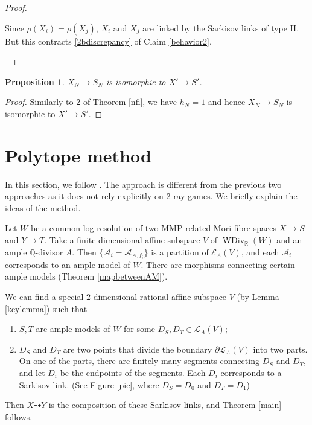\documentclass[11pt]{amsart}
\newtheorem{prop}[defn]{Proposition}
\begin{document}
\begin{proof}
\begin{enumerate}
          Since $\rho(X_{i})= \rho(X_{j})$, $X_{i}$  and $X_{j}$ are linked by  the Sarkisov links of type II. But this contracts  \ref{2bdiscrepancy} of  Claim \ref{behavior2}.
  \end{enumerate}
\end{proof}
\begin{prop}\label{nfi2}
  $X_{N}\to S_{N}$ is isomorphic to $X'\to S'$.
\end{prop}
\begin{proof}
  Similarly to 2 of Theorem \ref{nfi}, we have $h_{N}=1$ and hence $X_{N}\to S_{N}$ is isomorphic to $X'\to S'$.
\end{proof}



\section{Polytope method}\label{thirdmethod}
In this section, we follow \cite{haconSarkisovProgram2012}.
The approach is different from the previous two approaches as it does not rely explicitly on 2-ray games. We briefly explain the ideas of the method.

Let $W$ be a common log resolution of two MMP-related Mori fibre spaces $X\to S$ and $Y\to T$. Take a finite dimensional affine subspace $V$ of $\operatorname{WDiv}_{\mathbb{R}}(W)$ and an ample $\mathbb{Q}$-divisor $A$. Then $\{\mathcal{A}_{i} =\mathcal{A}_{A,f_{i}}\} $ is a partition of $\mathcal{E}_{A}(V)$, and each $\mathcal{A}_{i}$ corresponds to an ample model of $W$.    There are morphisms connecting certain ample models (Theorem \ref{mapbetweenAM}).

We can find a special $2$-dimensional rational affine subspace  $V$ (by Lemma \ref{keylemma}) such that
\begin{enumerate}
  \item $S,T$ are ample models of $W$ for some $D_{S},D_{T} \in \mathcal{L}_{A}(V) $;
    \item $D_{S}$ and $D_{T}$ are two points that divide the boundary $\partial \mathcal{L}_{A}(V)$ into two parts. On one of the parts, there are finitely many segments connecting $D_{S}$ and $D_{T}$, and let $D_{i}$ be the endpoints of the segments. Each $D_{i}$ corresponds to a Sarkisov link.
    (See Figure \ref{pic}, where $D_S=D_0$ and $D_T=D_1$)
    
\end{enumerate}

Then  $X\dashrightarrow Y$ is the composition of these Sarkisov links, and  Theorem \ref{main} follows.
\end{document}
